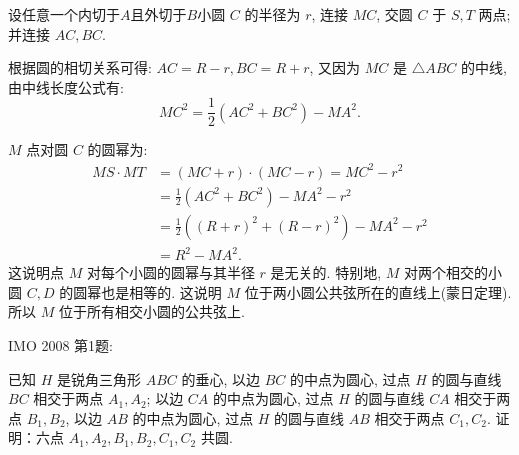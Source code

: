 \begin{figure*}[htbp]
\centering
{}
\end{figure*}

设任意一个内切于$A$且外切于$B$小圆 $C$ 的半径为 $r$, 连接 $MC$, 交圆 $C$ 于 $S,T$ 两点; 并连接 $AC, BC$.

根据圆的相切关系可得: $AC=R-r, BC=R+r$, 又因为 $MC$ 是 $\triangle ABC$ 的中线, 由中线长度公式有:
\[ MC^2 = \frac{1}{2}(AC^2+BC^2) - MA^2 .\]

$M$ 点对圆 $C$ 的圆幂为:
\begin{align*} 
MS\cdot MT &= (MC+r)\cdot(MC-r) = MC^2-r^2 \\
&=\frac{1}{2}(AC^2+BC^2) - MA^2-r^2 \\
&=  \frac{1}{2}\left((R+r)^2+(R-r)^2\right) - MA^2-r^2\\
&= R^2 - MA^2.
\end{align*}
这说明点 $M$ 对每个小圆的圆幂与其半径 $r$ 是无关的. 特别地, $M$ 对两个相交的小圆 $C,D$ 的圆幂也是相等的. 这说明 $M$ 位于两小圆公共弦所在的直线上(蒙日定理). 所以 $M$ 位于所有相交小圆的公共弦上.

\newpage

\noindent IMO 2008 第1题: 

已知 $H$ 是锐角三角形 $ABC$ 的垂心, 以边 $BC$ 的中点为圆心, 过点 $H$ 的圆与直线 $BC$ 相交于两点 $A_1, A_2$; 以边 $CA$ 的中点为圆心, 过点 $H$ 的圆与直线 $CA$ 相交于两点 $B_1, B_2$, 以边 $AB$ 的中点为圆心, 过点 $H$ 的圆与直线 $AB$ 相交于两点 $C_1, C_2$. 证明：六点 $A_1, A_2, B_1, B_2, C_1, C_2$ 共圆.

